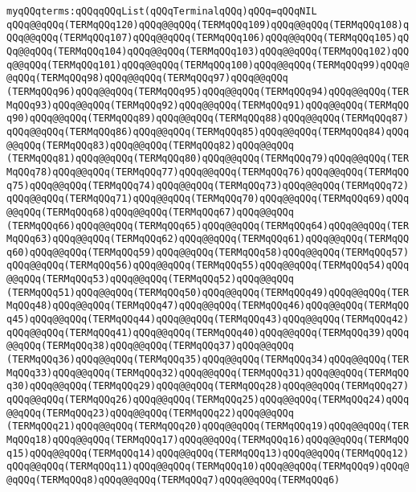 \verb|myqQQqterms:qQQqqQQqList(qQQqTerminalqQQq)qQQq=qQQqNIL|\newline
\verb|qQQq@@qQQq(TERMqQQq120)qQQq@@qQQq(TERMqQQq109)qQQq@@qQQq(TERMqQQq108)qQQq@@qQQq(TERMqQQq107)qQQq@@qQQq(TERMqQQq106)qQQq@@qQQq(TERMqQQq105)qQQq@@qQQq(TERMqQQq104)qQQq@@qQQq(TERMqQQq103)qQQq@@qQQq(TERMqQQq102)qQQq@@qQQq(TERMqQQq101)qQQq@@qQQq(TERMqQQq100)qQQq@@qQQq(TERMqQQq99)qQQq@@qQQq(TERMqQQq98)qQQq@@qQQq(TERMqQQq97)qQQq@@qQQq|\newline
\verb|(TERMqQQq96)qQQq@@qQQq(TERMqQQq95)qQQq@@qQQq(TERMqQQq94)qQQq@@qQQq(TERMqQQq93)qQQq@@qQQq(TERMqQQq92)qQQq@@qQQq(TERMqQQq91)qQQq@@qQQq(TERMqQQq90)qQQq@@qQQq(TERMqQQq89)qQQq@@qQQq(TERMqQQq88)qQQq@@qQQq(TERMqQQq87)qQQq@@qQQq(TERMqQQq86)qQQq@@qQQq(TERMqQQq85)qQQq@@qQQq(TERMqQQq84)qQQq@@qQQq(TERMqQQq83)qQQq@@qQQq(TERMqQQq82)qQQq@@qQQq|\newline
\verb|(TERMqQQq81)qQQq@@qQQq(TERMqQQq80)qQQq@@qQQq(TERMqQQq79)qQQq@@qQQq(TERMqQQq78)qQQq@@qQQq(TERMqQQq77)qQQq@@qQQq(TERMqQQq76)qQQq@@qQQq(TERMqQQq75)qQQq@@qQQq(TERMqQQq74)qQQq@@qQQq(TERMqQQq73)qQQq@@qQQq(TERMqQQq72)qQQq@@qQQq(TERMqQQq71)qQQq@@qQQq(TERMqQQq70)qQQq@@qQQq(TERMqQQq69)qQQq@@qQQq(TERMqQQq68)qQQq@@qQQq(TERMqQQq67)qQQq@@qQQq|\newline
\verb|(TERMqQQq66)qQQq@@qQQq(TERMqQQq65)qQQq@@qQQq(TERMqQQq64)qQQq@@qQQq(TERMqQQq63)qQQq@@qQQq(TERMqQQq62)qQQq@@qQQq(TERMqQQq61)qQQq@@qQQq(TERMqQQq60)qQQq@@qQQq(TERMqQQq59)qQQq@@qQQq(TERMqQQq58)qQQq@@qQQq(TERMqQQq57)qQQq@@qQQq(TERMqQQq56)qQQq@@qQQq(TERMqQQq55)qQQq@@qQQq(TERMqQQq54)qQQq@@qQQq(TERMqQQq53)qQQq@@qQQq(TERMqQQq52)qQQq@@qQQq|\newline
\verb|(TERMqQQq51)qQQq@@qQQq(TERMqQQq50)qQQq@@qQQq(TERMqQQq49)qQQq@@qQQq(TERMqQQq48)qQQq@@qQQq(TERMqQQq47)qQQq@@qQQq(TERMqQQq46)qQQq@@qQQq(TERMqQQq45)qQQq@@qQQq(TERMqQQq44)qQQq@@qQQq(TERMqQQq43)qQQq@@qQQq(TERMqQQq42)qQQq@@qQQq(TERMqQQq41)qQQq@@qQQq(TERMqQQq40)qQQq@@qQQq(TERMqQQq39)qQQq@@qQQq(TERMqQQq38)qQQq@@qQQq(TERMqQQq37)qQQq@@qQQq|\newline
\verb|(TERMqQQq36)qQQq@@qQQq(TERMqQQq35)qQQq@@qQQq(TERMqQQq34)qQQq@@qQQq(TERMqQQq33)qQQq@@qQQq(TERMqQQq32)qQQq@@qQQq(TERMqQQq31)qQQq@@qQQq(TERMqQQq30)qQQq@@qQQq(TERMqQQq29)qQQq@@qQQq(TERMqQQq28)qQQq@@qQQq(TERMqQQq27)qQQq@@qQQq(TERMqQQq26)qQQq@@qQQq(TERMqQQq25)qQQq@@qQQq(TERMqQQq24)qQQq@@qQQq(TERMqQQq23)qQQq@@qQQq(TERMqQQq22)qQQq@@qQQq|\newline
\verb|(TERMqQQq21)qQQq@@qQQq(TERMqQQq20)qQQq@@qQQq(TERMqQQq19)qQQq@@qQQq(TERMqQQq18)qQQq@@qQQq(TERMqQQq17)qQQq@@qQQq(TERMqQQq16)qQQq@@qQQq(TERMqQQq15)qQQq@@qQQq(TERMqQQq14)qQQq@@qQQq(TERMqQQq13)qQQq@@qQQq(TERMqQQq12)qQQq@@qQQq(TERMqQQq11)qQQq@@qQQq(TERMqQQq10)qQQq@@qQQq(TERMqQQq9)qQQq@@qQQq(TERMqQQq8)qQQq@@qQQq(TERMqQQq7)qQQq@@qQQq(TERMqQQq6)|\newline
